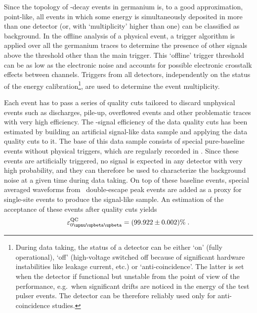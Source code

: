 Since the topology of \onbb-decay events in germanium is, to a good approximation,
point-like, all events in which some energy is simultaneously deposited in more than one
detector (or, with `multiplicity' higher than one) can be classified as background. In the
offline analysis of a physical event, a trigger algorithm is applied over all the
germanium traces to determine the presence of other signals above the threshold other than
the main trigger. This `offline' trigger threshold can be as low as the electronic noise
and accounts for possible electronic crosstalk effects between channels. Triggers from all
detectors, independently on the status of the energy calibration\footnote{%
  During data taking, the status of a detector can be either `on' (fully operational),
  `off' (high-voltage switched off because of significant hardware instabilities like
  leakage current, etc.) or `anti-coincidence'. The latter is set when the detector if
  functional but unstable from the point of view of the performance, e.g.~when significant
  drifts are noticed in the energy of the test pulser events. The detector can be
  therefore reliably used only for anti-coincidence studies.
}, are used to determine the event multiplicity.

Each event has to pass a series of quality cuts tailored to discard unphysical events such
as discharges, pile-up, overflowed events and other problematic traces with very high
efficiency. The \onbb-signal efficiency of the data quality cuts has been estimated by
building an artificial signal-like data sample and applying the data quality cuts to it.
The base of this data sample consists of special pure-baseline events without physical
triggers, which are regularly recorded in \gerda. Since these events are artificially
triggered, no signal is expected in any detector with very high probability, and they can
therefore be used to characterize the background noise at a given time during data taking.
On top of these baseline events, special averaged waveforms from \Th\ double-escape peak
events are added as a proxy for single-site events to produce the signal-like sample. An
estimation of the acceptance of these events after quality cuts yields
\[
  \epsilon_\onbbM^\text{QC} = (99.922 \pm 0.002)\% \;.
\]

